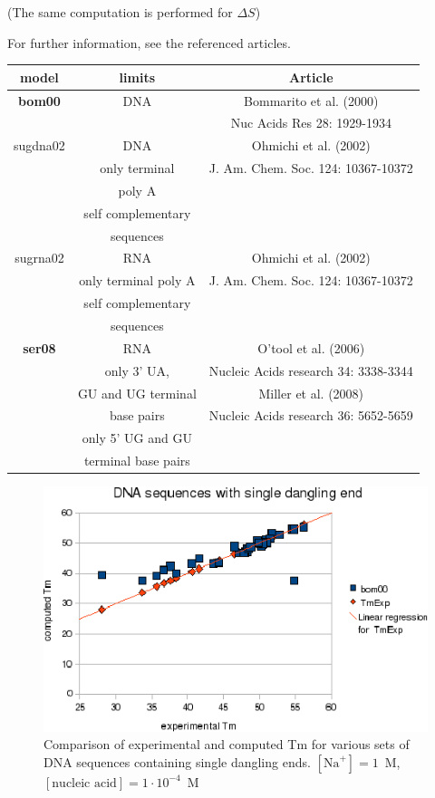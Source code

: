 \documentclass{article}
\begin{document}
       (The same computation is performed for $\Delta S$)

For further information, see the referenced articles.

\begin{table}[hc]
\begin{tabular}[h]{| c | c | c |}
\textbf{model} & \textbf{limits} & \textbf{Article} \\
\hline
\textbf{bom00} & DNA & Bommarito et al. (2000) \\
 & & Nuc Acids Res 28: 1929-1934 \\
\hline
sugdna02 & DNA & Ohmichi et al. (2002) \\
 & only terminal & J. Am. Chem. Soc. 124: 10367-10372 \\
 & poly A & \\
 & self complementary & \\
 & sequences & \\
 \hline
sugrna02 & RNA & Ohmichi et al. (2002) \\
 & only terminal poly A & J. Am. Chem. Soc. 124: 10367-10372 \\
 & self complementary & \\
 & sequences & \\
 \hline
\textbf{ser08} & RNA & O'tool et al. (2006) \\
 & only 3' UA, & Nucleic Acids research 34: 3338-3344 \\
 & GU and UG terminal & Miller et al. (2008) \\
 & base pairs & Nucleic Acids research 36: 5652-5659 \\
 & only 5' UG and GU & \\
 & terminal base pairs & \\
 \hline
\end{tabular}
\end{table}

\begin{figure}[h]
\includegraphics[width=1\linewidth]{images/DNASingleDanglingEnd}
\caption{Comparison of experimental and computed Tm for various sets of
 DNA sequences containing single dangling ends. $[\mbox{Na}^+] = 1$~M, $[\mbox{nucleic acid}] = 1\cdot{}10^{-4}$~M}
\end{figure}
\end{document}
